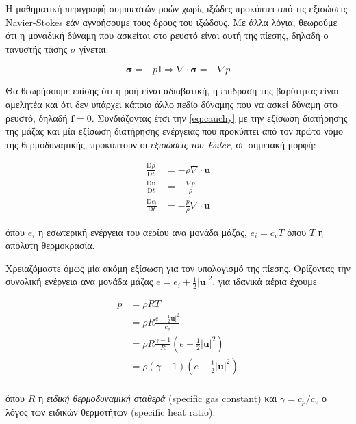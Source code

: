 Η μαθηματική περιγραφή συμπιεστών ροών χωρίς ιξώδες προκύπτει από τις εξισώσεις Navier-Stokes εάν αγνοήσουμε τους όρους του ιξώδους.
Με άλλα λόγια, θεωρούμε ότι η μοναδική δύναμη που ασκείται στο ρευστό είναι αυτή της πίεσης, δηλαδή ο τανυστής τάσης $\sigma$ γίνεται:

\begin{equation*}
    \mathbf{\sigma} = -p\mathbf{I} \Rightarrow \nabla \cdot \mathbf{\sigma} = -\nabla p
\end{equation*}

Θα θεωρήσουμε επίσης ότι η ροή είναι αδιαβατική, η επίδραση της βαρύτητας είναι αμελητέα και ότι δεν υπάρχει κάποιο άλλο πεδίο δύναμης που να ασκεί δύναμη στο ρευστό, δηλαδή $\mathbf{f} = 0$.
Συνδιάζοντας έτσι την \eqref{eq:cauchy} με την εξίσωση διατήρησης της μάζας και μία εξίσωση διατήρησης ενέργειας που προκύπτει από τον πρώτο νόμο της θερμοδυναμικής, προκύπτουν οι \emph{εξισώσεις του Euler}, σε σημειακή μορφή:

\begin{align}\label{eq:euler}
    \frac{\mathrm{D}\rho}{\mathrm{D}t} &= -\rho \nabla \cdot \mathbf{u} \\
    \frac{\mathrm{D} \mathbf{u}}{\mathrm{D}t} &= -\frac{\nabla p}{\rho} \\
    \frac{\mathrm{D} e_i}{\mathrm{D}t} &= -\frac{p}{\rho} \nabla \cdot \mathbf{u}
\end{align}

όπου $e_i$ η εσωτερική ενέργεια του αερίου ανα μονάδα μάζας, $e_i = c_v T$ όπου $T$ η απόλυτη θερμοκρασία.

Χρειαζόμαστε όμως μία ακόμη εξίσωση για τον υπολογισμό της πίεσης.
Ορίζοντας την συνολική ενέργεια ανα μονάδα μάζας $e = e_i + \frac{1}{2} |\mathbf{u}|^2$, για ιδανικά αέρια έχουμε

\begin{align*}
    p &= \rho R T \\
      &= \rho R \frac{e - \frac{1}{2} \mathbf{u}|^2}{c_v} \\
      &= \rho R \frac{\gamma - 1}{R} \left( e - \frac{1}{2} |\mathbf{u}|^2 \right) \\
      &= \rho \left(\gamma - 1\right) \left( e - \frac{1}{2} |\mathbf{u}|^2 \right) \\
\end{align*}

όπου $R$ η \emph{ειδική θερμοδυναμική σταθερά} (specific gas constant) και $\gamma = c_p / c_v$ ο λόγος των ειδικών θερμοτήτων (specific heat ratio).

